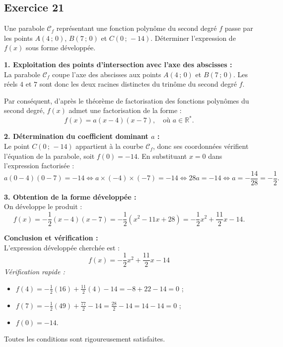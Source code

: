 \documentclass[11pt,a4paper]{article}
\begin{document}
\subsection*{Exercice 21}
Une parabole $\mathcal{C}_f$ représentant une fonction polynôme du second degré $f$ passe par les points $A(4\,;\,0)$, $B(7\,;\,0)$ et $C(0\,;\,-14)$. Déterminer l'expression de $f(x)$ sous forme développée.

\begin{correctionbox}
\textbf{1. Exploitation des points d'intersection avec l'axe des abscisses :}\\
La parabole $\mathcal{C}_f$ coupe l'axe des abscisses aux points $A(4\,;\,0)$ et $B(7\,;\,0)$. Les réels $4$ et $7$ sont donc les deux racines distinctes du trinôme du second degré $f$.

Par conséquent, d'après le théorème de factorisation des fonctions polynômes du second degré, $f(x)$ admet une factorisation de la forme :
\[
f(x) = a(x - 4)(x - 7), \quad \text{où } a \in \mathbb{R}^*.
\]

\textbf{2. Détermination du coefficient dominant $a$ :}\\
Le point $C(0\,;\,-14)$ appartient à la courbe $\mathcal{C}_f$, donc ses coordonnées vérifient l'équation de la parabole, soit $f(0) = -14$.
En substituant $x = 0$ dans l'expression factorisée :
\[
a(0 - 4)(0 - 7) = -14 \iff a \times (-4) \times (-7) = -14 \iff 28a = -14 \iff a = -\frac{14}{28} = -\frac{1}{2}.
\]

\textbf{3. Obtention de la forme développée :}\\
On développe le produit :
\[
f(x) = -\frac{1}{2}(x - 4)(x - 7) = -\frac{1}{2}(x^2 - 11x + 28) = -\frac{1}{2}x^2 + \frac{11}{2}x - 14.
\]

\textbf{Conclusion et vérification :}\\
L'expression développée cherchée est :
\[
\boxed{f(x) = -\frac{1}{2}x^2 + \frac{11}{2}x - 14}
\]
\textit{Vérification rapide :}
\begin{itemize}[leftmargin=*,label=\textbullet]
    \item $f(4) = -\frac{1}{2}(16) + \frac{11}{2}(4) - 14 = -8 + 22 - 14 = 0$ ;
    \item $f(7) = -\frac{1}{2}(49) + \frac{77}{2} - 14 = \frac{28}{2} - 14 = 14 - 14 = 0$ ;
    \item $f(0) = -14$.
\end{itemize}
Toutes les conditions sont rigoureusement satisfaites.
\end{correctionbox}
\end{document}
